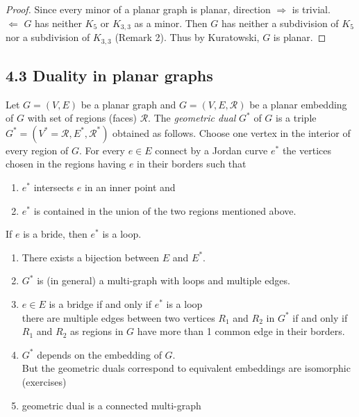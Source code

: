 \documentclass[aagt.tex]{subfiles}
\begin{document}
\begin{proof}
  Since every minor of a planar graph is planar, direction $\Rightarrow$ is trivial.
  \\
  $\Leftarrow$ $G$ has neither $K_5$ or $K_{3,3}$ as a minor. Then $G$ has neither a subdivision of $K_5$ nor a subdivision of $K_{3,3}$ (Remark 2).
  Thus by Kuratowski, $G$ is planar.
\end{proof}

\subsection{4.3 Duality in planar graphs}

\begin{defi*}
  Let $G = (V,E)$ be a planar graph and $G = (V,E,\mathcal{R})$ be a planar embedding of $G$ with set of regions (faces) $\mathcal{R}$.
  The \emph{geometric dual} $G^\ast$ of $G$ is a triple $G^\ast = (V^\ast = \mathcal{R},E^\ast,\mathcal{R}^\ast)$ obtained as follows.
  Choose one vertex in the interior of every region of $G$.
  For every $e \in E$ connect by a Jordan curve $e^\ast$ the vertices chosen in the regions having $e$ in their borders such that 
  \begin{enumerate}[label=\alph*)]
    \item $e^\ast$ intersects $e$ in an inner point and
    \item $e^\ast$ is contained in the union of the two regions mentioned above.
  \end{enumerate}
  If $e$ is a bride, then $e^\ast$ is a loop.
\end{defi*}

\begin{ex}
\end{ex}

\begin{rem}
  \begin{enumerate}
    \item There exists a bijection between $E$ and $E^\ast$.
    \item $G^\ast$ is (in general) a multi-graph with loops and multiple edges.
    \item $e \in E$ is a bridge if and only if $e^\ast$ is a loop \\
    there are multiple edges between two vertices $R_1$ and $R_2$ in $G^\ast$ if and only if $R_1$ and $R_2$ as regions in $G$ have more than 1 common edge in their borders.
    \item $G^\ast$ depends on the embedding of $G$. \\
    But the geometric duals correspond to equivalent embeddings are isomorphic  (exercises)
    \item geometric dual is a connected multi-graph
  \end{enumerate}
\end{rem}
\end{document}
